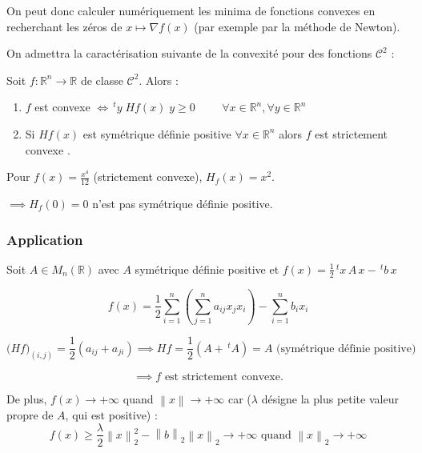 \documentclass[a4paper,11pt]{article}
\newcommand{\R}{\mathbb{R}}
\newcommand{\norm}[1]{\left\lVert#1\right\rVert}
\newcommand{\tpo}[1]{\,^t#1}
\newcommand{\deffonc}[3]{#1 : #2 \longrightarrow #3}
\newcommand{\Co}{\mathcal{C}}
\theoremstyle{plain} %
\begin{document}
\begin{remark}
    On peut donc calculer numériquement les minima de fonctions convexes en recherchant
    les zéros de $x \mapsto \nabla f(x)$ (par exemple par la méthode de Newton).

    On admettra la caractérisation suivante de la convexité pour des fonctions $\Co^2$ :
\end{remark}

\begin{lemme}
    Soit $\deffonc{f}{\R^n}{\R}$ de classe $\Co^2$. Alors :

    \begin{enumerate}[label=•]
        \item $f$ est convexe $\iff \tpo{y} \; Hf(x) \; y \geq 0 \hspace{1cm} \forall x \in \R^n, \forall y \in \R^n$

        \item Si $Hf(x)$ est symétrique définie positive $\forall x \in \R^n$ alors $f$ est strictement convexe \footnotemark.
    \end{enumerate}
\end{lemme}

\begin{remark}
    Pour $f(x) = \frac{x^4}{12}$ (strictement convexe), $H_f(x) = x^2$.

    $\implies H_f(0) = 0$ n'est pas symétrique définie positive.
\end{remark}

\subsubsection*{Application}
Soit $A \in M_n(\R)$ avec $A$ symétrique définie positive et $f(x)=\frac{1}{2} \tpo{x} \, A \, x - \tpo{b} \, x$

\[
    f(x) = \frac{1}{2} \sum_{i=1}^n \left( \sum_{j=1}^n a_{ij}x_j x_i \right) - \sum_{i=1}^n b_i x_i
\]

\[
    \Big( Hf \Big)_{(i,j)} = \frac{1}{2}(a_{ij} + a_{ji}) \implies
    Hf = \frac{1}{2}(A + \tpo{A}) = A \text{ (symétrique définie positive)}
\]

\[
    \implies f \text{ est strictement convexe.}
\]

De plus, $f(x) \longrightarrow +\infty$ quand $\norm{x} \longrightarrow +\infty$ car ($\lambda$ désigne
la plus petite valeur propre de $A$, qui est positive) :
\[
    f(x) \geq \frac{\lambda}{2} \norm{x}^2_2 - \norm{b}_2 \norm{x}_2 \longrightarrow +\infty \text{ quand } \norm{x}_2 \longrightarrow +\infty
\]
\end{document}
